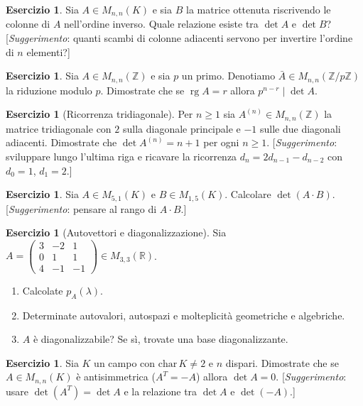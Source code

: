\documentclass[11pt, a4paper]{book}
\theoremstyle{definition}
\newtheorem{esercizio}[definizione]{Esercizio}
\theoremstyle{plain}
\theoremstyle{remark}
\newcommand{\Z}{\mathbb{Z}}
\newcommand{\R}{\mathbb{R}}
\DeclareMathOperator{\rg}{rg}
\begin{document}
\begin{esercizio}
Sia $A \in M_{n,n}(K)$ e sia $B$ la matrice ottenuta riscrivendo le colonne di $A$ nell'ordine inverso. Quale relazione esiste tra $\det A$ e $\det B$? [\emph{Suggerimento}: quanti scambi di colonne adiacenti servono per invertire l'ordine di $n$ elementi?]
\end{esercizio}

\begin{esercizio}
Sia $A \in M_{n,n}(\Z)$ e sia $p$ un primo. Denotiamo $\bar A \in M_{n,n}(\Z/p\Z)$ la riduzione modulo $p$. Dimostrate che se $\rg A = r$ allora $p^{n-r} \mid \det A$.
\end{esercizio}

\begin{esercizio}[Ricorrenza tridiagonale]
Per $n \geq 1$ sia $A^{(n)} \in M_{n,n}(\Z)$ la matrice tridiagonale con $2$ sulla diagonale principale e $-1$ sulle due diagonali adiacenti. Dimostrate che $\det A^{(n)} = n+1$ per ogni $n \geq 1$. [\emph{Suggerimento}: sviluppare lungo l'ultima riga e ricavare la ricorrenza $d_n = 2d_{n-1} - d_{n-2}$ con $d_0=1$, $d_1=2$.]
\end{esercizio}

\begin{esercizio}
Sia $A \in M_{5,1}(K)$ e $B \in M_{1,5}(K)$. Calcolare $\det(A\cdot B)$. [\emph{Suggerimento}: pensare al rango di $A\cdot B$.]
\end{esercizio}

\begin{esercizio}[Autovettori e diagonalizzazione]
Sia $A = \begin{pmatrix}3&-2&1\\0&1&1\\4&-1&-1\end{pmatrix} \in M_{3,3}(\R)$.
\begin{enumerate}
  \item Calcolate $p_A(\lambda)$.
  \item Determinate autovalori, autospazi e molteplicità geometriche e algebriche.
  \item $A$ è diagonalizzabile? Se sì, trovate una base diagonalizzante.
\end{enumerate}
\end{esercizio}

\begin{esercizio}
Sia $K$ un campo con $\mathrm{char}\,K \neq 2$ e $n$ dispari. Dimostrate che se $A \in M_{n,n}(K)$ è antisimmetrica ($A^T = -A$) allora $\det A = 0$. [\emph{Suggerimento}: usare $\det(A^T) = \det A$ e la relazione tra $\det A$ e $\det(-A)$.]
\end{esercizio}
\end{document}

